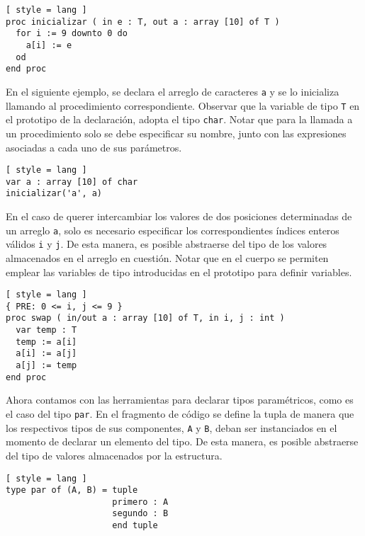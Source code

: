 \begin{lstlisting}[ style = lang ]
proc inicializar ( in e : T, out a : array [10] of T )
  for i := 9 downto 0 do
    a[i] := e
  od
end proc
\end{lstlisting}

En el siguiente ejemplo, se declara el arreglo de caracteres \lstinline[style = lang]{a} y se lo inicializa llamando al procedimiento correspondiente.
Observar que la variable de tipo \lstinline[style = lang]{T} en el prototipo de la declaración, adopta el tipo \lstinline[style = lang]{char}.
Notar que para la llamada a un procedimiento solo se debe especificar su nombre, junto con las expresiones asociadas a cada uno de sus parámetros.

\begin{lstlisting}[ style = lang ]
var a : array [10] of char
inicializar('a', a)
\end{lstlisting}

En el caso de querer intercambiar los valores de dos posiciones determinadas de un arreglo \lstinline[style = lang]{a}, solo es necesario especificar los correspondientes índices enteros válidos \lstinline[style = lang]{i} y \lstinline[style = lang]{j}.
De esta manera, es posible abstraerse del tipo de los valores almacenados en el arreglo en cuestión.
Notar que en el cuerpo se permiten emplear las variables de tipo introducidas en el prototipo para definir variables.

\begin{lstlisting}[ style = lang ]
{ PRE: 0 <= i, j <= 9 }
proc swap ( in/out a : array [10] of T, in i, j : int )
  var temp : T
  temp := a[i]
  a[i] := a[j]
  a[j] := temp
end proc
\end{lstlisting}

Ahora contamos con las herramientas para declarar tipos paramétricos, como es el caso del tipo \lstinline[style = lang]{par}.
En el fragmento de código se define la tupla de manera que los respectivos tipos de sus componentes, \lstinline[style = lang]{A} y \lstinline[style = lang]{B}, deban ser instanciados en el momento de declarar un elemento del tipo.
De esta manera, es posible abstraerse del tipo de valores almacenados por la estructura.

\begin{lstlisting}[ style = lang ]
type par of (A, B) = tuple
                     primero : A
                     segundo : B
                     end tuple
\end{lstlisting}

